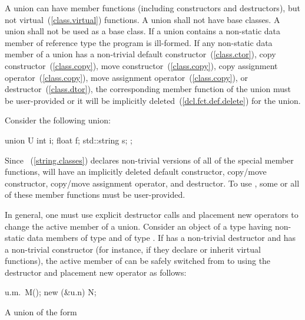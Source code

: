 \pnum
{}%
%
%
A union can have member functions (including constructors and destructors),
%
but not virtual~(\ref{class.virtual}) functions. A union shall not have
base classes. A union shall not be used as a base class.
%
If a union contains a non-static data member of
reference type the program is ill-formed.
\enternote If any non-static data member of a union has a non-trivial
default constructor~(\ref{class.ctor}),
copy constructor~(\ref{class.copy}),
move constructor~(\ref{class.copy}),
copy assignment operator~(\ref{class.copy}),
move assignment operator~(\ref{class.copy}),
or destructor~(\ref{class.dtor}), the corresponding member function
of the union must be user-provided or it will
be implicitly deleted~(\ref{dcl.fct.def.delete}) for the union. \exitnote

\pnum
\enterexample Consider the following union:

\begin{codeblock}
union U {
  int i;
  float f;
  std::string s;
};
\end{codeblock}

Since ~(\ref{string.classes}) declares non-trivial versions of all of the special
member functions,  will have an implicitly deleted default constructor,
copy/move constructor,
copy/move assignment operator, and destructor.
To use , some or all of these member functions
must be user-provided.\exitexample

\pnum
\enternote In general, one must use explicit destructor calls and placement
new operators to change the active member of a union. \exitnote
\enterexample
Consider an object  of a  type  having non-static data members
 of type  and  of type . If  has a non-trivial
destructor and  has a non-trivial constructor (for instance, if they declare or inherit
virtual functions), the active member of  can be safely switched from  to
 using the destructor and placement new operator as follows:

\begin{codeblock}
u.m.~M();
new (&u.n) N;
\end{codeblock}
\exitexample

\pnum
{}%
A union of the form


